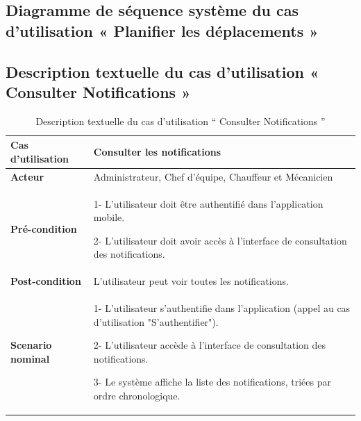 \subsection{Diagramme de séquence système du cas d’utilisation « Planifier les déplacements »}
\newpage

\subsection{Description textuelle du cas d’utilisation « Consulter Notifications »}

\begin{table}[htbp]
    \centering
    \renewcommand{\arraystretch}{1.5}
    \begin{tabular}{|p{4cm}|p{9.5cm}|}
        \hline
        \textbf{Cas d'utilisation} & Consulter les notifications                                                                              \\
        \hline
        \textbf{Acteur}            & Administrateur, Chef d’équipe, Chauffeur et Mécanicien                                                   \\
        \hline
        \textbf{Pré-condition}     & 1- L'utilisateur doit être authentifié dans l'application mobile.\newline

        2- L'utilisateur doit avoir accès à l'interface de consultation des notifications.                                                    \\


        \hline
        \textbf{Post-condition}    & L'utilisateur peut voir toutes les notifications.                                                        \\
        \hline
        \textbf{Scenario nominal}  & 1- L'utilisateur s'authentifie dans l'application (appel au cas d'utilisation "S'authentifier").\newline

        2- L'utilisateur accède à l'interface de consultation des notifications.\newline

        3- Le système affiche la liste des notifications, triées par ordre chronologique.                                                     \\

        \hline
    \end{tabular}
    \caption{Description textuelle du cas d’utilisation “ Consulter Notifications ”}

\end{table}


